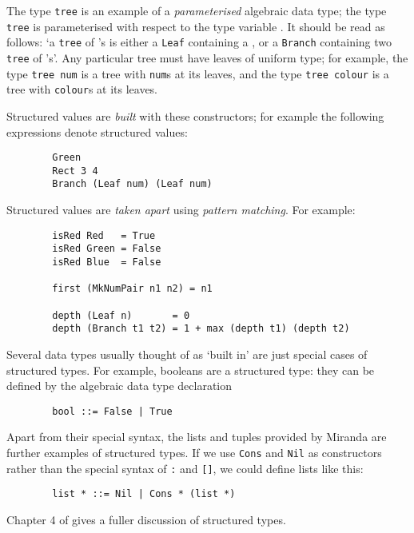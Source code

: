 The type \mbox{\tt tree} is an example of a {\em parameterised\/} algebraic data type;
the type \mbox{\tt tree} is parameterised with respect to the type variable \mbox{\tt *}.
It should be read as follows: `a \mbox{\tt tree} of \mbox{\tt *}'s is either a \mbox{\tt Leaf} containing
a \mbox{\tt *}, or
a \mbox{\tt Branch} containing two \mbox{\tt tree} of \mbox{\tt *}'s'.
Any particular tree must have leaves of uniform type; for example,
the type \mbox{\tt tree\ num} is a tree with \mbox{\tt num}s at its leaves, and the type
\mbox{\tt tree\ colour} is a tree with \mbox{\tt colour}s at its leaves.

Structured values are {\em built\/} with these constructors; for example the
following expressions denote structured values:
\begin{verbatim}
        Green
        Rect 3 4
        Branch (Leaf num) (Leaf num)
\end{verbatim}
Structured values are {\em taken apart\/} using
{\em pattern matching}.  For example:
\begin{verbatim}
        isRed Red   = True
        isRed Green = False
        isRed Blue  = False

        first (MkNumPair n1 n2) = n1

        depth (Leaf n)       = 0
        depth (Branch t1 t2) = 1 + max (depth t1) (depth t2)
\end{verbatim}
Several data types usually thought of as `built in' are just special
cases of structured types.  For example,
booleans are a structured type: they can be defined by the
algebraic data type declaration
\begin{verbatim}
        bool ::= False | True
\end{verbatim}
Apart from their special syntax, the lists and
tuples provided by Miranda
are further examples of structured types.  If we use \mbox{\tt Cons} and \mbox{\tt Nil}
as constructors rather than the special syntax of \mbox{\tt :} and \mbox{\tt []}, we could
define lists like this:
\begin{verbatim}
        list * ::= Nil | Cons * (list *)
\end{verbatim}
Chapter 4 of \cite{PJBook} gives a fuller discussion of structured types.

